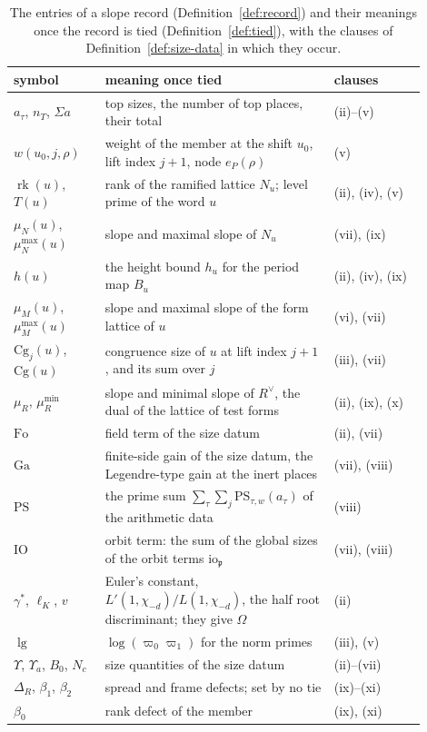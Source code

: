 \documentclass[11pt]{amsbook}
\theoremstyle{plain}
\theoremstyle{definition}
\theoremstyle{remark}
\numberwithin{equation}{section}
\numberwithin{figure}{chapter}
\numberwithin{table}{chapter}
\newcommand{\rk}{\operatorname{rk}}
\newcommand{\PS}{\mathrm{PS}}
\newcommand{\Cg}{\mathrm{Cg}}
\newcommand{\lgv}{\operatorname{lg}}
\newcommand{\Fo}{\mathrm{Fo}}
\newcommand{\Ga}{\mathrm{Ga}}
\newcommand{\IO}{\mathrm{IO}}
\begin{document}
\begin{table}[htbp]
\centering
\small
\begin{tabular}{@{}p{0.2\linewidth}p{0.5\linewidth}p{0.2\linewidth}@{}}
\toprule
symbol & meaning once tied & clauses\\
\midrule
$a_\tau$, $n_T$, $\Sigma a$ & top sizes, the number of top places,
their total & (ii)--(v)\\
$w(u_0,j,\rho)$ & weight of the member at the shift $u_0$, lift
index $j+1$, node $e_P(\rho)$ & (v)\\
$\rk(u)$, $T(u)$ & rank of the ramified lattice $N_u$; level prime of
the word $u$ & (ii), (iv), (v)\\
$\mu_N(u)$, $\mu_N^{\max}(u)$ & slope and maximal slope of $N_u$ &
(vii), (ix)\\
$h(u)$ & the height bound $h_u$ for the period map $B_u$ & (ii),
(iv), (ix)\\
$\mu_M(u)$, $\mu_M^{\max}(u)$ & slope and maximal slope of the form
lattice of $u$ & (vi), (vii)\\
$\Cg_j(u)$, $\Cg(u)$ & congruence size of $u$ at lift index $j+1$,
and its sum over $j$ & (iii), (vii)\\
$\mu_R$, $\mu_R^{\min}$ & slope and minimal slope of $R^\vee$, the
dual of the lattice of test forms & (ii), (ix), (x)\\
$\Fo$ & field term of the size datum & (ii), (vii)\\
$\Ga$ & finite-side gain of the size datum, the Legendre-type gain at
the inert places & (vii), (viii)\\
$\PS$ & the prime sum $\sum_\tau\sum_j\PS_{\tau,w}(a_\tau)$ of the
arithmetic data & (viii)\\
$\IO$ & orbit term: the sum of the global sizes of the orbit terms
$\mathrm{io}_{\mathfrak p}$ & (vii), (viii)\\
$\gamma^*$, $\ell_K$, $v$ & Euler's constant, $L'(1,\chi_{-d})/
L(1,\chi_{-d})$, the half root discriminant; they give $\Omega$ & (ii)\\
$\lgv$ & $\log(\varpi_0\varpi_1)$ for the norm primes & (iii), (v)\\
$\Upsilon$, $\Upsilon_a$, $B_0$, $N_c$ & size quantities of the size
datum & (ii)--(vii)\\
$\Delta_R$, $\beta_1$, $\beta_2$ & spread and frame defects; set by
no tie & (ix)--(xi)\\
$\beta_0$ & rank defect of the member & (ix), (xi)\\
\bottomrule
\end{tabular}
\caption{The entries of a slope record (Definition~\ref{def:record})
and their meanings once the record is tied
(Definition~\ref{def:tied}), with the clauses of
Definition~\ref{def:size-data} in which they occur.}
\label{tab:record-glossary}
\end{table}
\FloatBarrier
\end{document}
